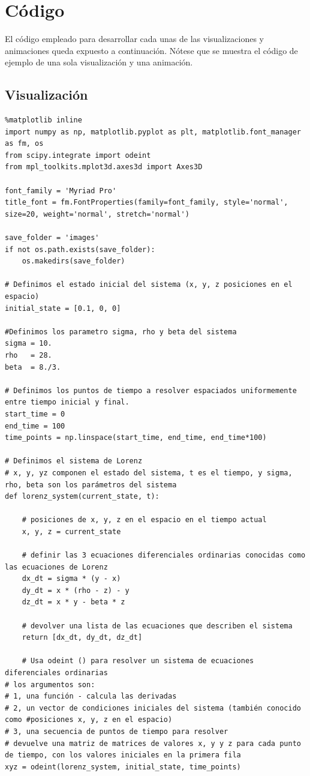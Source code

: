 \documentclass[12pt]{article}
\begin{document}
\section{Código}

El código empleado para desarrollar cada unas de las visualizaciones y animaciones queda expuesto a continuación. Nótese que se muestra el código de ejemplo de una sola visualización y una animación.

\subsection{Visualización}

\begin{verbatim}
%matplotlib inline
import numpy as np, matplotlib.pyplot as plt, matplotlib.font_manager as fm, os
from scipy.integrate import odeint
from mpl_toolkits.mplot3d.axes3d import Axes3D

font_family = 'Myriad Pro'
title_font = fm.FontProperties(family=font_family, style='normal', size=20, weight='normal', stretch='normal')

save_folder = 'images'
if not os.path.exists(save_folder):
    os.makedirs(save_folder)

# Definimos el estado inicial del sistema (x, y, z posiciones en el espacio)
initial_state = [0.1, 0, 0]

#Definimos los parametro sigma, rho y beta del sistema
sigma = 10.
rho   = 28.
beta  = 8./3.

# Definimos los puntos de tiempo a resolver espaciados uniformemente entre tiempo inicial y final.
start_time = 0
end_time = 100
time_points = np.linspace(start_time, end_time, end_time*100)

# Definimos el sistema de Lorenz
# x, y, yz componen el estado del sistema, t es el tiempo, y sigma, rho, beta son los parámetros del sistema
def lorenz_system(current_state, t):
    
    # posiciones de x, y, z en el espacio en el tiempo actual
    x, y, z = current_state
    
    # definir las 3 ecuaciones diferenciales ordinarias conocidas como las ecuaciones de Lorenz
    dx_dt = sigma * (y - x)
    dy_dt = x * (rho - z) - y
    dz_dt = x * y - beta * z
    
    # devolver una lista de las ecuaciones que describen el sistema
    return [dx_dt, dy_dt, dz_dt]
    
    # Usa odeint () para resolver un sistema de ecuaciones diferenciales ordinarias
# los argumentos son:
# 1, una función - calcula las derivadas
# 2, un vector de condiciones iniciales del sistema (también conocido como #posiciones x, y, z en el espacio)
# 3, una secuencia de puntos de tiempo para resolver
# devuelve una matriz de matrices de valores x, y y z para cada punto de tiempo, con los valores iniciales en la primera fila
xyz = odeint(lorenz_system, initial_state, time_points)


\end{verbatim}
\end{document}
